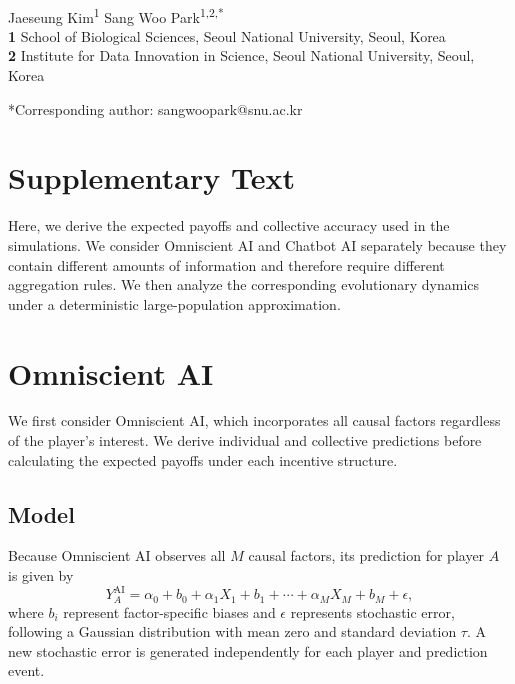 \documentclass[12pt]{article}
\date{\today}
\begin{document}
\begin{flushleft}{
	\Large
	\textbf{}
}
\newline
\\
Jaeseung Kim\textsuperscript{1} Sang Woo Park\textsuperscript{1,2,*}
\\
\bigskip
\textbf{1} School of Biological Sciences, Seoul National University, Seoul, Korea\\
\textbf{2} Institute for Data Innovation in Science, Seoul National University, Seoul, Korea
\bigskip

*Corresponding author: sangwoopark@snu.ac.kr
\end{flushleft}

\pagebreak

\section*{Supplementary Text}

Here, we derive the expected payoffs and collective accuracy used in the simulations.
We consider Omniscient AI and Chatbot AI separately because they contain different amounts of information and therefore require different aggregation rules.
We then analyze the corresponding evolutionary dynamics under a deterministic large-population approximation.

\section*{Omniscient AI}

We first consider Omniscient AI, which incorporates all causal factors regardless of the player's interest. 
We derive individual and collective predictions before calculating the expected payoffs under each incentive structure.

\subsection*{Model}

Because Omniscient AI observes all $M$ causal factors, its prediction for player $A$ is given by
\begin{equation}
Y_A^{\mathrm{AI}} = \alpha_0 + b_0 + \alpha_1 X_1 + b_1 + \cdots + \alpha_M X_M + b_M + \epsilon,
\end{equation}
where $b_i$ represent factor-specific biases and $\epsilon$ represents stochastic error, following a Gaussian distribution with mean zero and standard deviation $\tau$.
A new stochastic error is generated independently for each player and prediction event.
\end{document}
